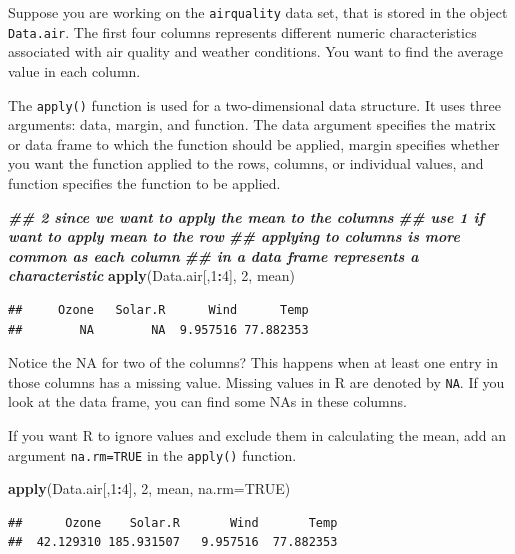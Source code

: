 \documentclass[
]{book}
\newenvironment{Shaded}{\begin{snugshade}}{\end{snugshade}}
\newcommand{\AttributeTok}[1]{\textcolor[rgb]{0.13,0.29,0.53}{#1}}
\newcommand{\ConstantTok}[1]{\textcolor[rgb]{0.56,0.35,0.01}{#1}}
\newcommand{\DecValTok}[1]{\textcolor[rgb]{0.00,0.00,0.81}{#1}}
\newcommand{\DocumentationTok}[1]{\textcolor[rgb]{0.56,0.35,0.01}{\textbf{\textit{#1}}}}
\newcommand{\FunctionTok}[1]{\textcolor[rgb]{0.13,0.29,0.53}{\textbf{#1}}}
\newcommand{\NormalTok}[1]{#1}
\newcommand{\SpecialCharTok}[1]{\textcolor[rgb]{0.81,0.36,0.00}{\textbf{#1}}}
\theoremstyle{definition}
\theoremstyle{definition}
\theoremstyle{definition}
\theoremstyle{definition}
\theoremstyle{remark}
\begin{document}
Suppose you are working on the \texttt{airquality} data set, that is stored in the object \texttt{Data.air}. The first four columns represents different numeric characteristics associated with air quality and weather conditions. You want to find the average value in each column.

The \texttt{apply()} function is used for a two-dimensional data structure. It uses three arguments: data, margin, and function. The data argument specifies the matrix or data frame to which the function should be applied, margin specifies whether you want the function applied to the rows, columns, or individual values, and function specifies the function to be applied.

\begin{Shaded}
\begin{Highlighting}[]
\DocumentationTok{\#\# 2 since we want to apply the mean to the columns}
\DocumentationTok{\#\# use 1 if want to apply mean to the row}
\DocumentationTok{\#\# applying to columns is more common as each column }
\DocumentationTok{\#\# in a data frame represents a characteristic}
\FunctionTok{apply}\NormalTok{(Data.air[,}\DecValTok{1}\SpecialCharTok{:}\DecValTok{4}\NormalTok{], }\DecValTok{2}\NormalTok{, mean)}
\end{Highlighting}
\end{Shaded}

\begin{verbatim}
##     Ozone   Solar.R      Wind      Temp 
##        NA        NA  9.957516 77.882353
\end{verbatim}

Notice the NA for two of the columns? This happens when at least one entry in those columns has a missing value. Missing values in R are denoted by \texttt{NA}. If you look at the data frame, you can find some NAs in these columns.

If you want R to ignore values and exclude them in calculating the mean, add an argument \texttt{na.rm=TRUE} in the \texttt{apply()} function.

\begin{Shaded}
\begin{Highlighting}[]
\FunctionTok{apply}\NormalTok{(Data.air[,}\DecValTok{1}\SpecialCharTok{:}\DecValTok{4}\NormalTok{], }\DecValTok{2}\NormalTok{, mean, }\AttributeTok{na.rm=}\ConstantTok{TRUE}\NormalTok{)}
\end{Highlighting}
\end{Shaded}

\begin{verbatim}
##      Ozone    Solar.R       Wind       Temp 
##  42.129310 185.931507   9.957516  77.882353
\end{verbatim}
\end{document}
